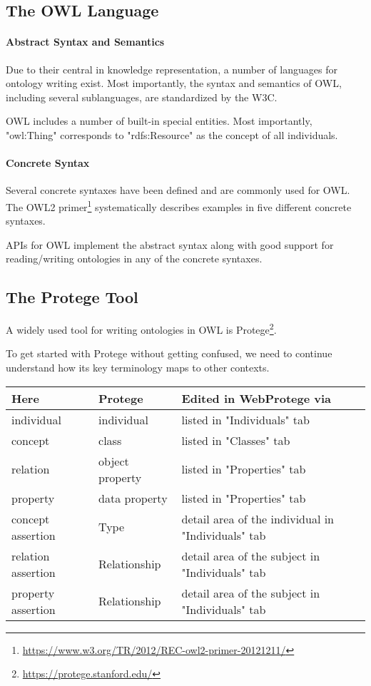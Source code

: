 \subsection{The OWL Language}

\paragraph{Abstract Syntax and Semantics}
Due to their central in knowledge representation, a number of languages for ontology writing exist.
Most importantly, the syntax and semantics of OWL, including several sublanguages, are standardized by the W3C.

OWL includes a number of built-in special entities.
Most importantly, "owl:Thing" corresponds to "rdfs:Resource" as the concept of all individuals.

\paragraph{Concrete Syntax}
Several concrete syntaxes have been defined and are commonly used for OWL.
The OWL2 primer\footnote{\url{https://www.w3.org/TR/2012/REC-owl2-primer-20121211/}} systematically describes examples in five different concrete syntaxes.

APIs for OWL implement the abstract syntax along with good support for reading/writing ontologies in any of the concrete syntaxes.

\subsection{The Protege Tool}

A widely used tool for writing ontologies in OWL is Protege\footnote{\url{https://protege.stanford.edu/}}.

To get started with Protege without getting confused, we need to continue understand how its key terminology maps to other contexts.
\begin{center}
\begin{tabular}{l|ll}
 Here       & Protege & Edited in WebProtege via \\
\hline
 individual & individual & listed in "Individuals" tab\\
 concept    & class   & listed in "Classes" tab  \\
 relation   & object property & listed in "Properties" tab\\
 property   & data property & listed in "Properties" tab\\
 concept assertion & Type & detail area of the individual in "Individuals" tab \\
 relation assertion & Relationship & detail area of the subject in "Individuals" tab \\
 property assertion & Relationship & detail area of the subject in "Individuals" tab \\
\end{tabular}
\end{center}

